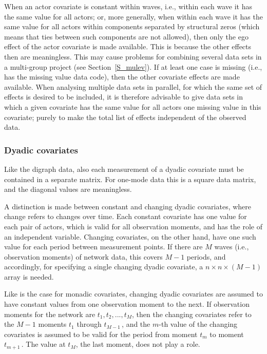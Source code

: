 \documentclass[a4paper,fleqn,11pt]{article}
\newcommand{\+}{\, + \,}
\begin{document}
When an actor covariate is constant within waves, i.e.,
within each wave it has the same value for all actors;
or, more generally, when within each wave it has the same value for
all actors
within components separated by structural zeros (which means that
ties between such components are not allowed), then only the ego effect
of the actor covariate is made available.
This is because the other effects then are meaningless.
This may cause problems for combining several data sets
in a multi-group project (see Section~\ref{S_mulev}).
If at least one case is missing (i.e., has the missing value data code),
then the other covariate effects are made available.
When analysing multiple data sets in parallel,
for which the same set of effects is desired to be included,
it is therefore advisable to give data sets in which
a given covariate has the same value for all actors
one missing value in this covariate; purely to make
the total list of effects independent of the observed data.



\subsubsection{Dyadic covariates}

Like the digraph data, also each measurement of a dyadic covariate
must be contained in a separate matrix.
For one-mode data this is a square data matrix,
and the diagonal values are meaningless.

A distinction is made between constant and changing dyadic
covariates, where change refers to changes over time. Each constant
covariate has one value for each pair of actors, which is valid for
all observation moments, and has the role of an independent
variable. Changing covariates, on the other hand, have one such
value for each period between measurement points. If there are $M$
waves (i.e., observation moments) of network data,
this covers $M-1$ periods, and accordingly,
for specifying a single changing dyadic covariate,
a $n \times n \times (M-1)$ array is needed.

Like is the case for monadic  covariates,
changing dyadic covariates are assumed to have constant values from one
observation moment to the next. If observation moments for the
network are $t_1, t_2, ..., t_M$, then the changing covariates
refer to the $M-1$ moments $t_1$ through $t_{M-1}\,$, and
the $m$-th value of the changing covariates is assumed to be valid
for the period from moment $t_m$ to moment $t_{m+1}\,$.
The value at $t_M$, the last moment, does not play a role.
\end{document}
